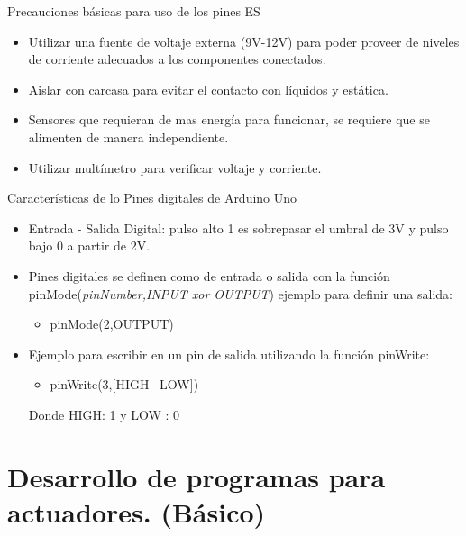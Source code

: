 \documentclass{beamer}
\theoremstyle{definition}
\begin{document}
\begin{frame}{Precauciones básicas para uso de los pines E\/S}

\begin{itemize}
\item Utilizar una fuente de voltaje externa (9V-12V) para poder proveer de niveles de corriente adecuados a los componentes conectados.
\item Aislar con carcasa para evitar el contacto con líquidos y estática.
\item Sensores que requieran de mas energía para funcionar, se requiere que se alimenten de manera independiente.
\item Utilizar multímetro para verificar voltaje y corriente.
\end{itemize}

\end{frame}



\begin{frame}{Características de lo Pines digitales de Arduino Uno}

\begin{itemize}
\item Entrada - Salida Digital: pulso alto 1 es sobrepasar el umbral de 3V y pulso bajo 0 a partir de 2V.
\item Pines digitales se definen como de entrada o salida con la función pinMode(\textit{pinNumber,INPUT xor OUTPUT}) ejemplo para definir una salida:
\begin{itemize}
\item pinMode(2,OUTPUT)
\end{itemize}
\item Ejemplo para escribir en un pin de salida utilizando la función pinWrite:
\begin{itemize}
\item pinWrite(3,[HIGH \ LOW])
\end{itemize}
Donde HIGH: 1 y LOW : 0
\end{itemize}

\end{frame}


\section{Desarrollo de programas para actuadores. (Básico)}
\end{document}

